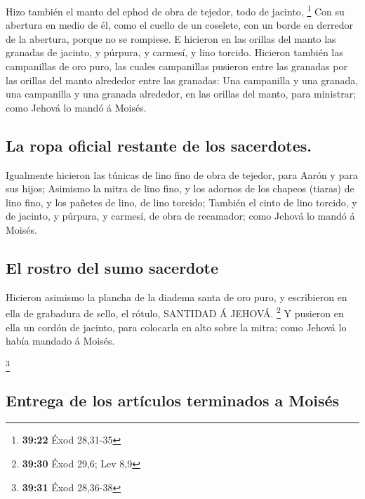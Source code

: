  Hizo también el manto del ephod de obra de tejedor, todo
de jacinto, \footnote{\textbf{39:22} Éxod 28,31-35}  Con
su abertura en medio de él, como el cuello de un coselete, con un borde
en derredor de la abertura, porque no se rompiese.  E
hicieron en las orillas del manto las granadas de jacinto, y púrpura, y
carmesí, y lino torcido.  Hicieron también las
campanillas de oro puro, las cuales campanillas pusieron entre las
granadas por las orillas del manto alrededor entre las granadas:
 Una campanilla y una granada, una campanilla y una
granada alrededor, en las orillas del manto, para ministrar; como Jehová
lo mandó á Moisés.

\hypertarget{la-ropa-oficial-restante-de-los-sacerdotes.}{%
\subsection{La ropa oficial restante de los
sacerdotes.}\label{la-ropa-oficial-restante-de-los-sacerdotes.}}

 Igualmente hicieron las túnicas de lino fino de obra de
tejedor, para Aarón y para sus hijos;  Asimismo la mitra
de lino fino, y los adornos de los chapeos (tiaras) de lino fino, y los
pañetes de lino, de lino torcido;  También el cinto de
lino torcido, y de jacinto, y púrpura, y carmesí, de obra de recamador;
como Jehová lo mandó á Moisés.

\hypertarget{el-rostro-del-sumo-sacerdote}{%
\subsection{El rostro del sumo
sacerdote}\label{el-rostro-del-sumo-sacerdote}}

 Hicieron asimismo la plancha de la diadema santa de oro
puro, y escribieron en ella de grabadura de sello, el rótulo, SANTIDAD Á
JEHOVÁ. \footnote{\textbf{39:30} Éxod 29,6; Lev 8,9}  Y
pusieron en ella un cordón de jacinto, para colocarla en alto sobre la
mitra; como Jehová lo había mandado á Moisés.

\footnote{\textbf{39:31} Éxod 28,36-38}

\hypertarget{entrega-de-los-artuxedculos-terminados-a-moisuxe9s}{%
\subsection{Entrega de los artículos terminados a
Moisés}\label{entrega-de-los-artuxedculos-terminados-a-moisuxe9s}}

